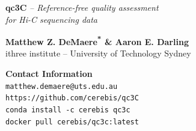 \documentclass[a0,landscape]{a0poster}
\begin{document}


\begin{minipage}[b]{0.55\linewidth}
{\veryHuge\color{NavyBlue} \textbf{qc3C} \color{Black} \textit{-- Reference-free quality assessment \\ for Hi-C sequencing data}\par}
\vspace{1em}
\huge \textbf{Matthew Z. DeMaere\textsuperscript{*} \& Aaron E. Darling}\\ %
\huge ithree institute -- University of Technology Sydney\\ %
\end{minipage}
%
\begin{minipage}[b]{0.25\linewidth}
\color{DarkSlateGray}\Large \textbf{Contact Information}\\
\texttt{matthew.demaere@uts.edu.au}\\ %
\texttt{https://github.com/cerebis/qc3C}\\
\texttt{conda install -c cerebis qc3c}\\
\texttt{docker pull cerebis/qc3c:latest}\\
\end{minipage}
%
\begin{minipage}[b]{0.19\linewidth}
\end{minipage}
\end{document}
